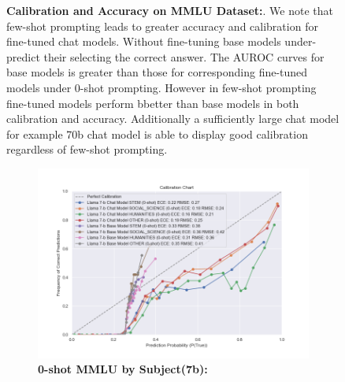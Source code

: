 \documentclass[11pt]{article}
\begin{document}
\begin{figure}
        \caption{\textbf{Calibration and Accuracy on MMLU Dataset:}. We note that few-shot prompting leads to greater accuracy and calibration for fine-tuned chat models. Without fine-tuning base models under-predict their selecting the correct answer. The AUROC curves for base models is greater than those for corresponding fine-tuned models under 0-shot prompting. However in few-shot prompting fine-tuned models perform bbetter than base models in both calibration and accuracy. Additionally a sufficiently large chat model for example 70b chat model is able to display good calibration regardless of few-shot prompting.}
        
        \label{fig:0-5-shot-MMLU}
\end{figure}


\begin{figure}
     \centering
     \begin{subfigure}[b]{0.60\textwidth}
         \centering \includegraphics[width=1.1\textwidth]{figures/0-shot-MMLU-subjects-7b.png}
         \caption{\textbf{0-shot MMLU by Subject(7b):} }
         \label{fig:0-shot-MMLU-subjects-7b}
     \end{subfigure}
     \hfill
     \begin{subfigure}[b]{0.38\textwidth}

\end{subfigure}
\end{figure}
\end{document}
